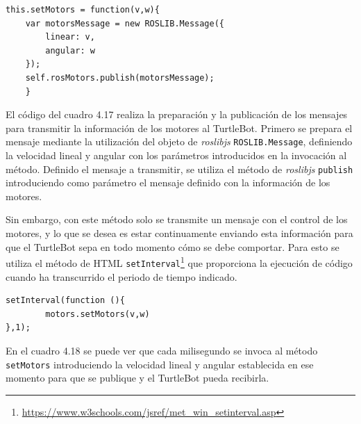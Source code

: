 \begin{lstlisting}[caption= Preparación y publicación del mensaje con el control de los motores, label=cod.motores]
this.setMotors = function(v,w){
	var motorsMessage = new ROSLIB.Message({
		linear: v,
		angular: w
	});
	self.rosMotors.publish(motorsMessage);
	}
\end{lstlisting}

El código del cuadro 4.17 realiza la preparación y la publicación de los mensajes para transmitir la información de los motores al TurtleBot. Primero se prepara el mensaje mediante la utilización del objeto de \textit{roslibjs} \texttt{ROSLIB.Message}, definiendo la velocidad lineal y angular con los parámetros introducidos en la invocación al método. Definido el mensaje a transmitir, se utiliza el método de \textit{roslibjs} \texttt{publish} introduciendo como parámetro el mensaje definido con la información de los motores.

Sin embargo, con este método solo se transmite un mensaje con el control de los motores, y lo que se desea es estar continuamente enviando esta información para que el TurtleBot sepa en todo momento cómo se debe comportar. Para esto se utiliza el método de HTML \texttt{setInterval}\footnote{\url{https://www.w3schools.com/jsref/met_win_setinterval.asp}} que proporciona la ejecución de código cuando ha transcurrido el periodo de tiempo indicado.

\begin{lstlisting}[caption= Invocación cada milisegundo al método para publicar el mensaje con los motores, label=cod.setintervalTurtle]
setInterval(function (){
        motors.setMotors(v,w)
},1);
\end{lstlisting}

En el cuadro 4.18 se puede ver que cada milisegundo se invoca al método \texttt{setMotors} introduciendo la velocidad lineal y angular establecida en ese momento para que se publique y el TurtleBot pueda recibirla.

